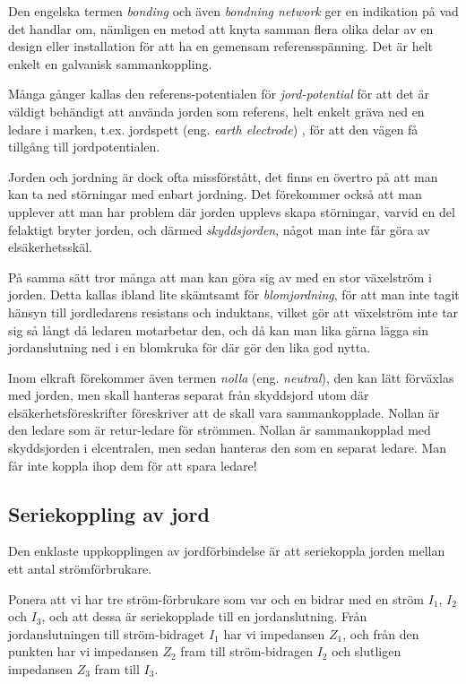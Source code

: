 Den engelska termen \emph{bonding} och även \emph{bondning network} ger en
indikation på vad det handlar om, nämligen en metod att knyta samman flera
olika delar av en design eller installation för att ha en gemensam
referensspänning. Det är helt enkelt en galvanisk sammankoppling.

Många gånger kallas den referens-potentialen för \emph{jord-potential} för att
det är väldigt behändigt att använda jorden som referens, helt enkelt gräva ned
en ledare i marken, t.ex. jordspett (eng. \emph{earth electrode})
\cite[3.1.2]{K27-1991}, för att den vägen få tillgång till jordpotentialen.

Jorden och jordning är dock ofta missförstått, det finns en övertro på att man
kan ta ned störningar med enbart jordning. Det förekommer också att man
upplever att man har problem där jorden upplevs skapa störningar, varvid en
del felaktigt bryter jorden, och därmed \emph{skyddsjorden}, något man inte
får göra av elsäkerhetsskäl.

På samma sätt tror många att man kan göra sig av med en stor växelström i
jorden. Detta kallas ibland lite skämtsamt för \emph{blomjordning}, för att
man inte tagit hänsyn till jordledarens resistans och induktans, vilket gör
att växelström inte tar sig så långt då ledaren motarbetar den, och då kan man
lika gärna lägga sin jordanslutning ned i en blomkruka för där gör den lika
god nytta.

Inom elkraft förekommer även termen \emph{nolla} (eng. \emph{neutral}), den
kan lätt förväxlas med jorden, men skall hanteras separat från skyddsjord utom
där elsäkerhetsföreskrifter föreskriver att de skall vara sammankopplade.
Nollan är den ledare som är retur-ledare för strömmen. Nollan är sammankopplad
med skyddsjorden i elcentralen, men sedan hanteras den som en separat ledare.
Man får inte koppla ihop dem för att spara ledare!

\subsection{Seriekoppling av jord}

Den enklaste uppkopplingen av jordförbindelse är att seriekoppla jorden
\cite[3]{ott1988} mellan ett antal strömförbrukare.

Ponera att vi har tre ström-förbrukare som var och en bidrar med en ström
\(I_1\), \(I_2\) och \(I_3\), och att dessa är seriekopplade till en
jordanslutning. Från jordanslutningen till ström-bidraget \(I_1\) har vi
impedansen \(Z_1\), och från den punkten har vi impedansen \(Z_2\) fram till
ström-bidragen \(I_2\) och slutligen impedansen \(Z_3\) fram till \(I_3\).

